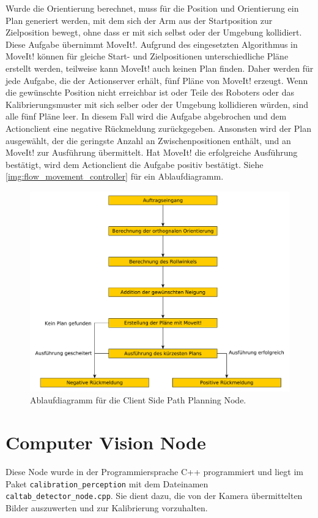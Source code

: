 Wurde die Orientierung berechnet, muss für die Position und Orientierung ein Plan generiert werden, mit dem sich der Arm aus der Startposition zur Zielposition bewegt, ohne dass er mit sich selbst oder der Umgebung kollidiert. Diese Aufgabe übernimmt MoveIt!. Aufgrund des eingesetzten Algorithmus in MoveIt! können für gleiche Start- und Zielpositionen unterschiedliche Pläne erstellt werden, teilweise kann MoveIt! auch keinen Plan finden. Daher werden für jede Aufgabe, die der Actionserver erhält, fünf Pläne von MoveIt! erzeugt. Wenn die gewünschte Position nicht erreichbar ist oder Teile des Roboters oder das Kalibrierungsmuster mit sich selber oder der Umgebung kollidieren würden, sind alle fünf Pläne leer. In diesem Fall wird die Aufgabe abgebrochen und dem Actionclient eine negative Rückmeldung zurückgegeben. Ansonsten wird der Plan ausgewählt, der die geringste Anzahl an Zwischenpositionen enthält, und an MoveIt! zur Ausführung übermittelt. Hat MoveIt! die erfolgreiche Ausführung bestätigt, wird dem Actionclient die Aufgabe positiv bestätigt. Siehe \autoref{img:flow_movement_controller} für ein Ablaufdiagramm.
\begin{figure}
\centering
\includegraphics[width=\textwidth]{images/movement_handler}
\caption{Ablaufdiagramm für die Client Side Path Planning Node.}\label{img:flow_movement_controller}
\end{figure}

\section{Computer Vision Node} %
\label{sec:caltab_detector_node_impl}
Diese Node wurde in der Programmiersprache C++ programmiert und liegt im Paket \texttt{calibration\_perception} mit dem Dateinamen \texttt{caltab\_detector\_node.cpp}. Sie dient dazu, die von der Kamera übermittelten Bilder auszuwerten und zur Kalibrierung vorzuhalten.


